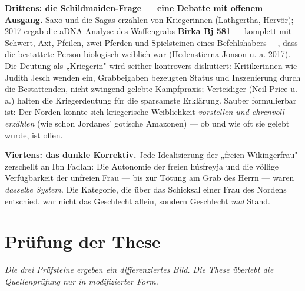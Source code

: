 \documentclass[11pt,a4paper,ngerman]{scrartcl}
\newcommand{\chipbase}[2]{\hspace{0pt}{\footnotesize\textcolor{#1}{[\textsc{#2}]}}}
\newcommand{\chipbelegt}[1]{\chipbase{chipgreen}{#1}}
\newcommand{\chipumstritten}[1]{\chipbase{chipred}{#1}}
\begin{document}
\textbf{Drittens: die Schildmaiden-Frage — eine Debatte mit offenem Ausgang.} Saxo und die Sagas erzählen von Kriegerinnen (Lathgertha, Hervör); 2017 ergab die aDNA-Analyse des Waffengrabs \textbf{Birka Bj 581} — komplett mit Schwert, Axt, Pfeilen, zwei Pferden und Spielsteinen eines Befehlshabers —, dass die bestattete Person biologisch weiblich war (Hedenstierna-Jonson u. a. 2017). Die Deutung als „Kriegerin" wird seither kontrovers diskutiert: Kritikerinnen wie Judith Jesch wenden ein, Grabbeigaben bezeugten Status und Inszenierung durch die Bestattenden, nicht zwingend gelebte Kampfpraxis; Verteidiger (Neil Price u. a.) halten die Kriegerdeutung für die sparsamste Erklärung. \chipumstritten{umstritten} Sauber formulierbar ist: Der Norden konnte sich kriegerische Weiblichkeit \emph{vorstellen und ehrenvoll erzählen} (wie schon Jordanes' gotische Amazonen) — ob und wie oft sie gelebt wurde, ist offen.

\textbf{Viertens: das dunkle Korrektiv.} Jede Idealisierung der „freien Wikingerfrau" zerschellt an Ibn Fadlan: Die Autonomie der freien húsfreyja und die völlige Verfügbarkeit der unfreien Frau — bis zur Tötung am Grab des Herrn — waren \emph{dasselbe System}. Die Kategorie, die über das Schicksal einer Frau des Nordens entschied, war nicht das Geschlecht allein, sondern Geschlecht \emph{mal} Stand. \chipbelegt{belegt}


\section{Prüfung der These}

\noindent\textit{Die drei Prüfsteine ergeben ein differenziertes Bild. Die These überlebt die Quellenprüfung nur in modifizierter Form.}
\medskip
\end{document}
